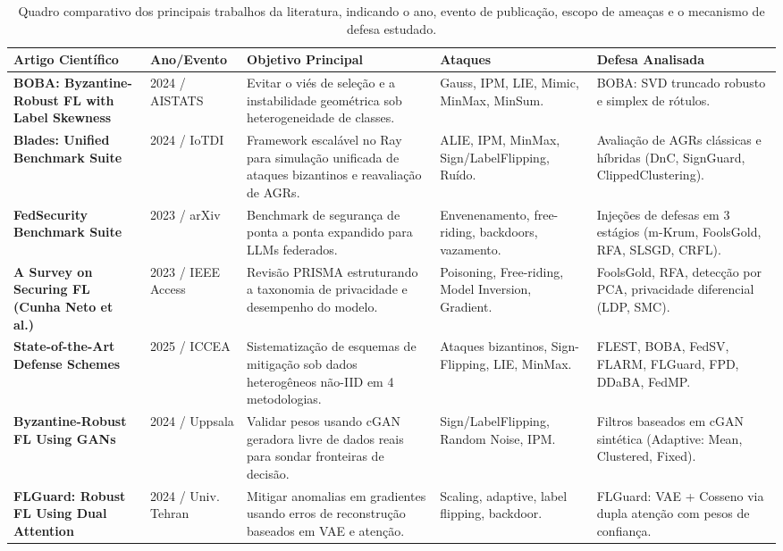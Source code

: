 \documentclass[11pt,a4paper]{article}
\begin{document}
\begin{table}[htbp]
\centering
\caption{Quadro comparativo dos principais trabalhos da literatura, indicando o ano, evento de publicação, escopo de ameaças e o mecanismo de defesa estudado.}
\label{tab:artigos}
\fontsize{7.5}{10}\selectfont
\begin{tabular}{p{3.8cm}p{1.2cm}p{5.5cm}p{2.8cm}p{3.2cm}}
\toprule
\textbf{Artigo Científico} & \textbf{Ano/Evento} & \textbf{Objetivo Principal} & \textbf{Ataques} & \textbf{Defesa Analisada} \\
\midrule
\rowcolor{lightbg} \textbf{BOBA: Byzantine-Robust FL with Label Skewness} & 2024 / AISTATS & Evitar o viés de seleção e a instabilidade geométrica sob heterogeneidade de classes. & Gauss, IPM, LIE, Mimic, MinMax, MinSum. & BOBA: SVD truncado robusto e simplex de rótulos. \\
\textbf{Blades: Unified Benchmark Suite} & 2024 / IoTDI & Framework escalável no Ray para simulação unificada de ataques bizantinos e reavaliação de AGRs. & ALIE, IPM, MinMax, Sign/LabelFlipping, Ruído. & Avaliação de AGRs clássicas e híbridas (DnC, SignGuard, ClippedClustering). \\
\rowcolor{lightbg} \textbf{FedSecurity Benchmark Suite} & 2023 / arXiv & Benchmark de segurança de ponta a ponta expandido para LLMs federados. & Envenenamento, free-riding, backdoors, vazamento. & Injeções de defesas em 3 estágios (m-Krum, FoolsGold, RFA, SLSGD, CRFL). \\
\textbf{A Survey on Securing FL (Cunha Neto et al.)} & 2023 / IEEE Access & Revisão PRISMA estruturando a taxonomia de privacidade e desempenho do modelo. & Poisoning, Free-riding, Model Inversion, Gradient. & FoolsGold, RFA, detecção por PCA, privacidade diferencial (LDP, SMC). \\
\rowcolor{lightbg} \textbf{State-of-the-Art Defense Schemes} & 2025 / ICCEA & Sistematização de esquemas de mitigação sob dados heterogêneos não-IID em 4 metodologias. & Ataques bizantinos, Sign-Flipping, LIE, MinMax. & FLEST, BOBA, FedSV, FLARM, FLGuard, FPD, DDaBA, FedMP. \\
\textbf{Byzantine-Robust FL Using GANs} & 2024 / Uppsala & Validar pesos usando cGAN geradora livre de dados reais para sondar fronteiras de decisão. & Sign/LabelFlipping, Random Noise, IPM. & Filtros baseados em cGAN sintética (Adaptive: Mean, Clustered, Fixed). \\
\rowcolor{lightbg} \textbf{FLGuard: Robust FL Using Dual Attention} & 2024 / Univ. Tehran & Mitigar anomalias em gradientes usando erros de reconstrução baseados em VAE e atenção. & Scaling, adaptive, label flipping, backdoor. & FLGuard: VAE + Cosseno via dupla atenção com pesos de confiança. \\

\end{tabular}
\end{table}
\end{document}
